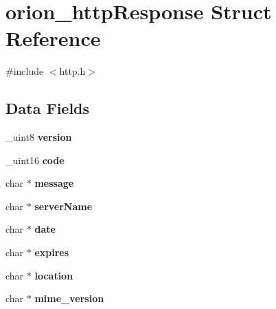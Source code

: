 \hypertarget{structorion__httpResponse}{
\section{orion\_\-httpResponse Struct Reference}
\label{structorion__httpResponse}
}


{\ttfamily \#include $<$http.h$>$}

\subsection*{Data Fields}
\begin{DoxyCompactItemize}
\item 
\hypertarget{structorion__httpResponse_a66448dd48b6943fcdb38c26676ce1da2}{
\_\-uint8 {\bfseries version}}
\label{structorion__httpResponse_a66448dd48b6943fcdb38c26676ce1da2}

\item 
\hypertarget{structorion__httpResponse_ac1b503937ec426e43bcecc35d8e3abb2}{
\_\-uint16 {\bfseries code}}
\label{structorion__httpResponse_ac1b503937ec426e43bcecc35d8e3abb2}

\item 
\hypertarget{structorion__httpResponse_a727cb1a29b2f86105987f32925cdd093}{
char $\ast$ {\bfseries message}}
\label{structorion__httpResponse_a727cb1a29b2f86105987f32925cdd093}

\item 
\hypertarget{structorion__httpResponse_a6ac6b482e13001c6638d4bd3640df5b3}{
char $\ast$ {\bfseries serverName}}
\label{structorion__httpResponse_a6ac6b482e13001c6638d4bd3640df5b3}

\item 
\hypertarget{structorion__httpResponse_a50a6c19e8816251771a937e0174a0811}{
char $\ast$ {\bfseries date}}
\label{structorion__httpResponse_a50a6c19e8816251771a937e0174a0811}

\item 
\hypertarget{structorion__httpResponse_a06eef6c38cd80ac50b32b0bba3ba715d}{
char $\ast$ {\bfseries expires}}
\label{structorion__httpResponse_a06eef6c38cd80ac50b32b0bba3ba715d}

\item 
\hypertarget{structorion__httpResponse_a7a944d185ca433cc1e14149baa5d331e}{
char $\ast$ {\bfseries location}}
\label{structorion__httpResponse_a7a944d185ca433cc1e14149baa5d331e}

\item 
\hypertarget{structorion__httpResponse_aad2b284eabf64b4c613acdf1b0d96543}{
char $\ast$ {\bfseries mime\_\-version}}
\label{structorion__httpResponse_aad2b284eabf64b4c613acdf1b0d96543}


\end{DoxyCompactItemize}
